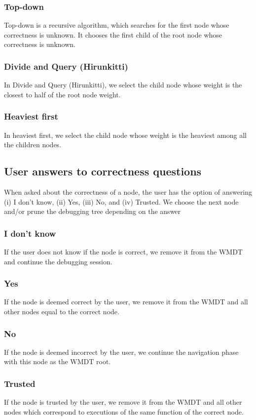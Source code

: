 \subsubsection{Top-down}
Top-down is a recursive algorithm, which searches for the first node whose correctness is unknown. It chooses the first child of the root node whose correctness is unknown.

\subsubsection{Divide and Query (Hirunkitti)}
In Divide and Query (Hirunkitti), we select the child node whose weight is the closest to half of the root node weight.

\subsubsection{Heaviest first}
In heaviest first, we select the child node whose weight is the heaviest among all the children nodes.

\subsection{User answers to correctness questions}
\label{architecture:correctnessAnswers}
When asked about the correctness of a node, the user has the option of answering (i) I don't know, (ii) Yes, (iii) No, and (iv) Trusted.
We choose the next node and/or prune the debugging tree depending on the answer
\subsubsection{I don't know}
If the user does not know if the node is correct, we remove it from the WMDT and continue the debugging session.
\subsubsection{Yes}
If the node is deemed correct by the user, we remove it from the WMDT and all other nodes equal to the correct node.

\subsubsection{No}
If the node is deemed incorrect by the user, we continue the navigation phase with this node as the WMDT root.
\subsubsection{Trusted}
If the node is trusted by the user, we remove it from the WMDT and all other nodes which correspond to executions of the same function of the correct node.


